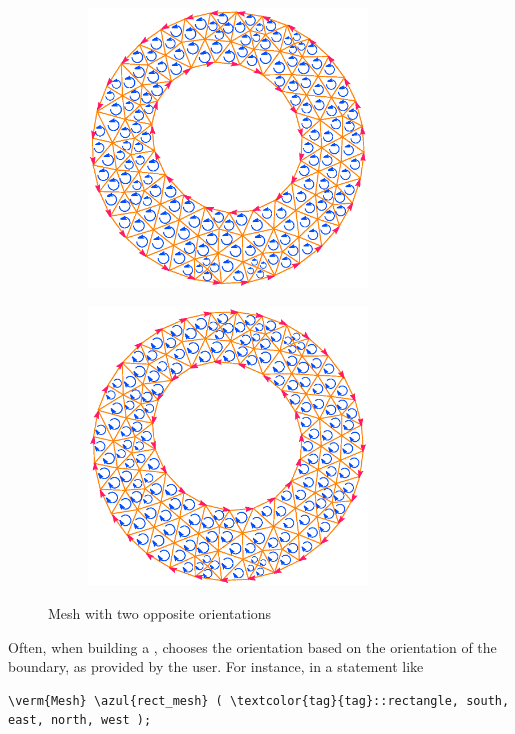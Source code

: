 \begin{figure}[ht] \centering
\begin{subfigure}{75mm}\centering
  \includegraphics[width=74mm]{oriented-annulus-1}
\end{subfigure}  
\begin{subfigure}{75mm}\centering
  \includegraphics[width=74mm]{oriented-annulus-2}
\end{subfigure}  
  \caption{Mesh with two opposite orientations}
  \label{\numb section 1.\numb fig 4}
\end{figure}

Often, when building a {\small\tt{}}, {\maniFEM} chooses the orientation based
on the orientation of the boundary, as provided by the user.
For instance, in a statement like

\begin{Verbatim}[commandchars=\\\{\},formatcom=\small\tt,baselinestretch=0.94]
   \verm{Mesh} \azul{rect_mesh} ( \textcolor{tag}{tag}::rectangle, south, east, north, west );
\end{Verbatim}

